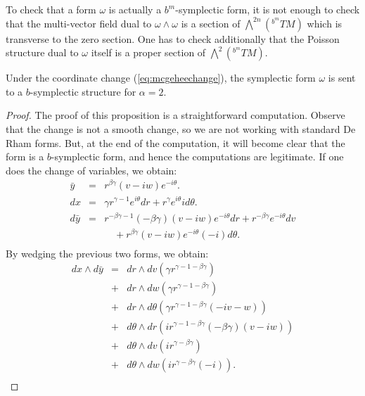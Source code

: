 \begin{remark}
To check that a form $\omega$ is actually a $b^m$-symplectic form, it is not enough to check that the multi-vector field dual to $\omega\wedge\omega$ is a section of $\bigwedge^{2n}(^{b^m}TM)$  which is transverse to the zero section. One has to check additionally that the Poisson structure dual to $\omega$ itself is a proper section of $\bigwedge^{2}(^{b^m}TM)$.
\end{remark}


\begin{proposition} Under the coordinate change (\ref{eq:mcgeheechange}), the symplectic form $\omega$ is sent to a $b$-symplectic structure for $\alpha = 2$.
\end{proposition}

\begin{proof}
The proof of this proposition is a straightforward computation.
Observe that the change is not a smooth change, so we are not working with standard De Rham forms. But, at the end of the computation, it will become clear that the form is a $b$-symplectic form, and hence the computations are legitimate.
If one does the change of variables, we obtain:
\begin{equation}
\begin{array}{rcl}
 \bar{y} & = & r^{\beta\gamma}(v - iw)e^{-i\theta}. \\
 dx & = & \gamma r^{\gamma-1} e^{i\theta}dr + r^{\gamma}e^{i\theta}id\theta. \\
 d\bar{y} & = & r^{-\beta\gamma-1}(-\beta\gamma)(v - iw)e^{-i\theta}dr + r^{-\beta\gamma}e^{-i\theta}dv \\
 & & \quad + r^{\beta\gamma}(v - iw)e^{-i\theta}(-i)d\theta. \\
\end{array}
\end{equation}
By wedging the previous two forms, we obtain:
\begin{equation}
\begin{array}{rcl}
dx \wedge d\bar{y} & = & dr\wedge dv (\gamma r^{\gamma-1-\beta\gamma})\\
& + & dr\wedge dw (\gamma r^{\gamma-1-\beta\gamma})\\
& + & dr\wedge d\theta (\gamma r^{\gamma-1-\beta\gamma}(-iv-w))\\
& + & d\theta \wedge dr (ir^{\gamma-1-\beta\gamma}(-\beta\gamma)(v-iw))\\
& + & d\theta\wedge dv(ir^{\gamma-\beta\gamma})\\
& + & d\theta\wedge dw(ir^{\gamma-\beta\gamma}(-i)).\\

\end{array}
\end{equation}
\end{proof}

